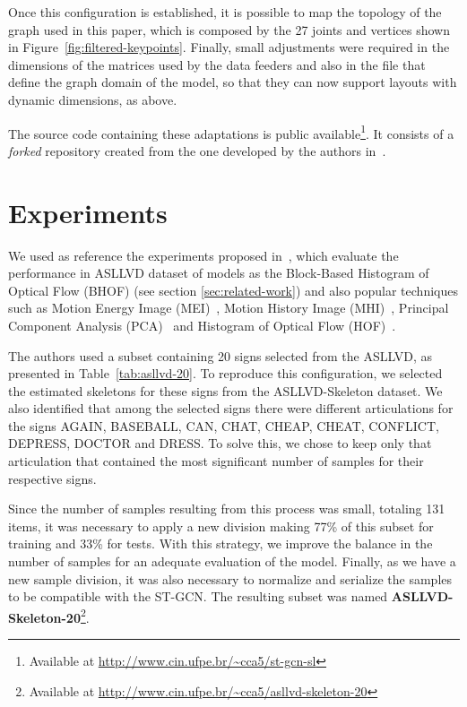 Once this configuration is established, it is possible to map the topology of the graph used in this paper, which is composed by the 27 joints and vertices shown in  Figure~\ref{fig:filtered-keypoints}. Finally, small adjustments were required in the dimensions of the matrices used by the data feeders and also in the file
that define the graph domain of the model, so that they can now support layouts with dynamic dimensions, as above.

The source code containing these adaptations is public available\footnote{
    Available at \url{http://www.cin.ufpe.br/~cca5/st-gcn-sl}
}. It consists of a \textit{forked} repository created from the one developed by the authors in~\cite{st-gcn-2018}.


\section{Experiments} 
\label{sec:experiments}

We used as reference the experiments proposed in~\cite{lim-2016}, which evaluate the performance in ASLLVD dataset of models as the Block-Based Histogram of Optical Flow (BHOF) (see section \ref{sec:related-work}) and also popular techniques such as Motion Energy Image (MEI)~\cite{athitsos-asllvd-2008}, Motion History Image (MHI)~\cite{babu-2004}, Principal Component Analysis (PCA)~\cite{dreuw-2012} and Histogram of Optical Flow (HOF)~\cite{laptev-2008}.

The authors used a subset containing 20 signs selected from the ASLLVD, as presented in Table~\ref{tab:asllvd-20}. To reproduce this configuration, we selected the estimated skeletons for these signs from the ASLLVD-Skeleton dataset. 
We also identified that among the selected signs there were different articulations for the signs AGAIN, BASEBALL, CAN, CHAT, CHEAP, CHEAT, CONFLICT, DEPRESS, DOCTOR and DRESS. To solve this, we chose to keep only that articulation that contained the most significant number of samples for their respective signs.

Since the number of samples resulting from this process was small, totaling 131 items, it was necessary to apply a new division making 77\% of this subset for training and 33\% for tests. With this strategy, we improve the balance in the number of samples for an adequate evaluation of the model. Finally, as we have a new sample division, it was also necessary to normalize and serialize the samples to be compatible with the ST-GCN. 
The resulting subset was named \textbf{ASLLVD-Skeleton-20}\footnote{ Available at \url{http://www.cin.ufpe.br/~cca5/asllvd-skeleton-20} }.

